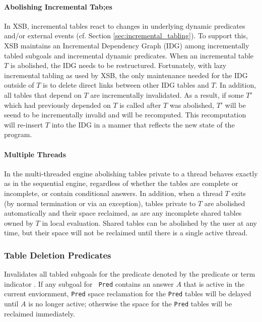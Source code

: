 \begin{description}
\paragraph{Abolishing Incremental Tab;es}
In XSB, incremental tables react to changes in underlying dynamic
predicates and/or external events (cf. Section
\ref{sec:incremental_tabling}).  To support this, XSB maintains an
Incremental Dependency Graph (IDG) among incrementally tabled subgoals
and incremental dynamic predicates.  When an incremental table $T$ is
abolished, the IDG needs to be restructured.  Fortunately, with lazy
incremental tabling as used by XSB, the only maintenance needed for
the IDG outside of $T$ is to delete direct links between other IDG
tables and $T$.  In addition, all tables that depend on $T$ are
incrementally invalidated.  As a result, if some $T'$ which had
previously depended on $T$ is called after $T$ was abolished, $T'$
will be seend to be incrementally invalid and will be recomputed.
This recomputation will re-insert $T$ into the IDG in a manner that
reflects the new state of the program.

\paragraph{Multiple Threads}
In the multi-threaded engine abolishing tables private to a thread
behaves exactly as in the sequential engine, regardless of whether the
tables are complete or incomplete, or contain conditional answers.  In
addition, when a thread $T$ exits (by normal termination or via an
exception), tables private to $T$ are abolished automatically and
their space reclaimed, as are any incomplete shared tables owned by
$T$ in local evaluation.  Shared tables can be abolished by the user
at any time, but their space will not be reclaimed until there is a
single active thread.

\subsubsection{Table Deletion Predicates}

\begin{description}
%
Invalidates all tabled subgoals for the predicate denoted by the
predicate or term indicator .  If any subgoal for {\tt
  Pred} contains an answer $A$ that is active in the current
enviornment, {\tt Pred} space reclamation for the {\tt Pred} tables
will be delayed until $A$ is no longer active; otherwise the space for
the {\tt Pred} tables will be reclaimed immediately.  


\end{description}
\end{description}
